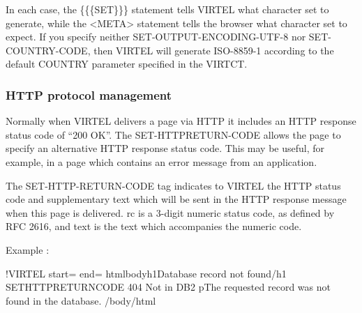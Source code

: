 \documentclass[letterpaper,10pt,english]{sphinxmanual}
\begin{document}
In each case, the \{\{\{SET\}\}\} statement tells VIRTEL what character set to generate, while the \textless{}META\textgreater{} statement tells the browser what character set to expect. If you specify neither SET-OUTPUT-ENCODING-UTF-8 nor SET-COUNTRY-CODE, then VIRTEL will generate ISO-8859-1 according to the default COUNTRY parameter specified in the VIRTCT.


\subsubsection{HTTP protocol management}
\label{\detokenize{User_Guide:http-protocol-management}}

Normally when VIRTEL delivers a page via HTTP it includes an HTTP response status code of “200 OK”. The SET-HTTPRETURN-CODE allows the page to specify an alternative HTTP response status code. This may be useful, for example, in a page which contains an error message from an application.


\begin{sphinxVerbatim}[commandchars=\\\{\}]
   
\end{sphinxVerbatim}

The SET-HTTP-RETURN-CODE tag indicates to VIRTEL the HTTP status code and supplementary text which will be sent in the HTTP response message when this page is delivered. rc is a 3-digit numeric status code, as defined by RFC 2616, and text is the text which accompanies the numeric code.

Example :

\begin{sphinxVerbatim}[commandchars=\\\{\}]
\PYGZlt{}!\PYGZhy{}\PYGZhy{}VIRTEL start=\PYGZdq{}\PYGZob{}\PYGZob{}\PYGZob{}\PYGZdq{} end=\PYGZdq{}\PYGZcb{}\PYGZcb{}\PYGZcb{}\PYGZdq{} \PYGZhy{}\PYGZhy{}\PYGZgt{}
\PYGZlt{}html\PYGZgt{}\PYGZlt{}body\PYGZgt{}\PYGZlt{}h1\PYGZgt{}Database record not found\PYGZlt{}/h1\PYGZgt{}
\PYGZob{}\PYGZob{}\PYGZob{}SET\PYGZhy{}HTTP\PYGZhy{}RETURN\PYGZhy{}CODE \PYGZdq{}404 Not in DB2\PYGZdq{}\PYGZcb{}\PYGZcb{}\PYGZcb{}
\PYGZlt{}p\PYGZgt{}The requested record was not found in the database.
\PYGZlt{}/body\PYGZgt{}\PYGZlt{}/html\PYGZgt{}
\end{sphinxVerbatim}
\end{document}
